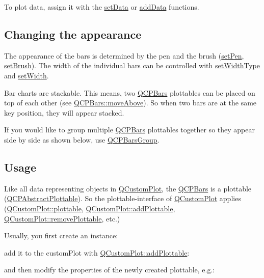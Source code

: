 To plot data, assign it with the \hyperlink{classQCPBars_aa3435aab19e0a49e4e7b41bd36a8d96b}{set\+Data} or \hyperlink{classQCPBars_a1f29cf08615040993209147fa68de3f2}{add\+Data} functions.\hypertarget{classQCPStatisticalBox_appearance}{}\subsection{Changing the appearance}\label{classQCPStatisticalBox_appearance}
The appearance of the bars is determined by the pen and the brush (\hyperlink{classQCPAbstractPlottable_ab74b09ae4c0e7e13142fe4b5bf46cac7}{set\+Pen}, \hyperlink{classQCPAbstractPlottable_a7a4b92144dca6453a1f0f210e27edc74}{set\+Brush}). The width of the individual bars can be controlled with \hyperlink{classQCPBars_adcaa3b41281bb2c0f7949b341592fcc0}{set\+Width\+Type} and \hyperlink{classQCPBars_afec6116579d44d5b706e0fa5e5332507}{set\+Width}.

Bar charts are stackable. This means, two \hyperlink{classQCPBars}{Q\+C\+P\+Bars} plottables can be placed on top of each other (see \hyperlink{classQCPBars_ac22e00a6a41509538c21b04f0a57318c}{Q\+C\+P\+Bars\+::move\+Above}). So when two bars are at the same key position, they will appear stacked.

If you would like to group multiple \hyperlink{classQCPBars}{Q\+C\+P\+Bars} plottables together so they appear side by side as shown below, use \hyperlink{classQCPBarsGroup}{Q\+C\+P\+Bars\+Group}.

\hypertarget{classQCPStatisticalBox_usage}{}\subsection{Usage}\label{classQCPStatisticalBox_usage}
Like all data representing objects in \hyperlink{classQCustomPlot}{Q\+Custom\+Plot}, the \hyperlink{classQCPBars}{Q\+C\+P\+Bars} is a plottable (\hyperlink{classQCPAbstractPlottable}{Q\+C\+P\+Abstract\+Plottable}). So the plottable-\/interface of \hyperlink{classQCustomPlot}{Q\+Custom\+Plot} applies (\hyperlink{classQCustomPlot_a32de81ff53e263e785b83b52ecd99d6f}{Q\+Custom\+Plot\+::plottable}, \hyperlink{classQCustomPlot_ab7ad9174f701f9c6f64e378df77927a6}{Q\+Custom\+Plot\+::add\+Plottable}, \hyperlink{classQCustomPlot_af3dafd56884208474f311d6226513ab2}{Q\+Custom\+Plot\+::remove\+Plottable}, etc.)

Usually, you first create an instance\+: 
\begin{DoxyCodeInclude}
\end{DoxyCodeInclude}
add it to the custom\+Plot with \hyperlink{classQCustomPlot_ab7ad9174f701f9c6f64e378df77927a6}{Q\+Custom\+Plot\+::add\+Plottable}\+: 
\begin{DoxyCodeInclude}
\end{DoxyCodeInclude}
and then modify the properties of the newly created plottable, e.\+g.\+: 
\begin{DoxyCodeInclude}
\end{DoxyCodeInclude}


